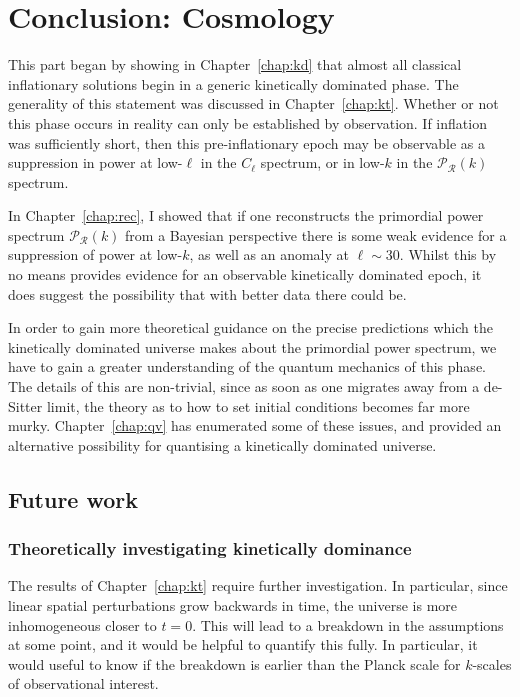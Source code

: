 \chapter*[Conclusion: Cosmology]{Conclusion: Cosmology}

This part began by showing in Chapter~\ref{chap:kd} that almost all classical inflationary solutions begin in a generic kinetically dominated phase. The generality of this statement was discussed in Chapter~\ref{chap:kt}. 
Whether or not this phase occurs in reality can only be established by observation. If inflation was sufficiently short, then this pre-inflationary epoch may be observable as a suppression in power at low-$\ell$ in the $C_\ell$ spectrum, or in low-$k$ in the $\mathcal{P}_\mathcal{R}(k)$ spectrum. 

In Chapter~\ref{chap:rec}, I showed that if one reconstructs the primordial power spectrum $\mathcal{P}_\mathcal{R}(k)$ from a Bayesian perspective there is some weak evidence for a suppression of power at low-$k$, as well as an anomaly at $\ell\sim30$. Whilst this by no means provides evidence for an observable kinetically dominated epoch, it does suggest the possibility that with better data there could be.

In order to gain more theoretical guidance on the precise predictions which the kinetically dominated universe makes about the primordial power spectrum, we have to gain a greater understanding of the quantum mechanics of this phase. The details of this are non-trivial, since as soon as one migrates away from a de-Sitter limit, the theory as to how to set initial conditions becomes far more murky. Chapter~\ref{chap:qv} has enumerated some of these issues, and provided an alternative possibility for quantising a kinetically dominated universe.

\section*{Future work}
\subsection*{Theoretically investigating kinetically dominance}
The results of Chapter~\ref{chap:kt} require further investigation. In particular, since linear spatial perturbations grow backwards in time, the universe is more inhomogeneous closer to $t=0$. This will lead to a breakdown in the assumptions at some point, and it would be helpful to quantify this fully. In particular, it would useful to know if the breakdown is earlier than the Planck scale for $k$-scales of observational interest.

